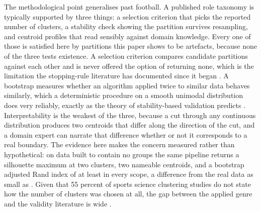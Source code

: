 The methodological point generalises past football. A published role taxonomy is typically
supported by three things: a selection criterion that picks the reported number of clusters, a
stability check showing the partition survives resampling, and centroid profiles that read
sensibly against domain knowledge. Every one of those is satisfied here by partitions this paper
shows to be artefacts, because none of the three tests existence. A selection criterion compares
candidate partitions against each other and is never offered the option of returning none, which
is the limitation the stopping-rule literature has documented since it began
\citep{milligan1985examination, rousseeuw1987silhouettes}. A bootstrap measures whether an
algorithm applied twice to similar data behaves similarly, which a deterministic procedure on a
smooth unimodal distribution does very reliably, exactly as the theory of stability-based
validation predicts \citep{benhur2002stability, vonluxburg2010stability}. Interpretability is the
weakest of the three, because a cut through any continuous distribution produces two centroids
that differ along the direction of the cut, and a domain expert can narrate that difference
whether or not it corresponds to a real boundary. The evidence here makes the concern measured
rather than hypothetical: on data built to contain no groups the same pipeline returns a
silhouette maximum at two clusters, two nameable centroids, and a bootstrap adjusted Rand index of
at least \StrBootNullMinSingle{} in every scope, a difference from the real data as small as
\StrBootGapMin{}. Given that 55 percent of sports science clustering studies do not state how the
number of clusters was chosen at all, the gap between the applied genre and the validity
literature is wide \citep{fernandez2024reporting}.

